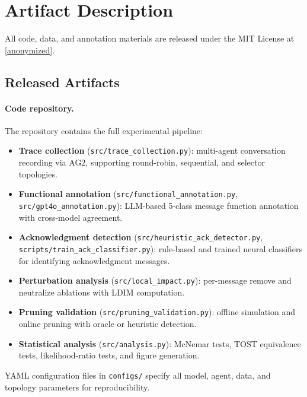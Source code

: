 \section{Artifact Description}
\label{app:artifacts}

All code, data, and annotation materials are released under the MIT License at \url{[anonymized]}.

\subsection{Released Artifacts}

\paragraph{Code repository.}
The repository contains the full experimental pipeline:
\begin{itemize}[nosep]
  \item \textbf{Trace collection} (\texttt{src/trace\_collection.py}): multi-agent conversation recording via AG2, supporting round-robin, sequential, and selector topologies.
  \item \textbf{Functional annotation} (\texttt{src/functional\_annotation.py}, \texttt{src/gpt4o\_annotation.py}): LLM-based 5-class message function annotation with cross-model agreement.
  \item \textbf{Acknowledgment detection} (\texttt{src/heuristic\_ack\_detector.py}, \texttt{scripts/train\_ack\_classifier.py}): rule-based and trained neural classifiers for identifying acknowledgment messages.
  \item \textbf{Perturbation analysis} (\texttt{src/local\_impact.py}): per-message remove and neutralize ablations with LDIM computation.
  \item \textbf{Pruning validation} (\texttt{src/pruning\_validation.py}): offline simulation and online pruning with oracle or heuristic detection.
  \item \textbf{Statistical analysis} (\texttt{src/analysis.py}): McNemar tests, TOST equivalence tests, likelihood-ratio tests, and figure generation.
\end{itemize}
YAML configuration files in \texttt{configs/} specify all model, agent, data, and topology parameters for reproducibility.

